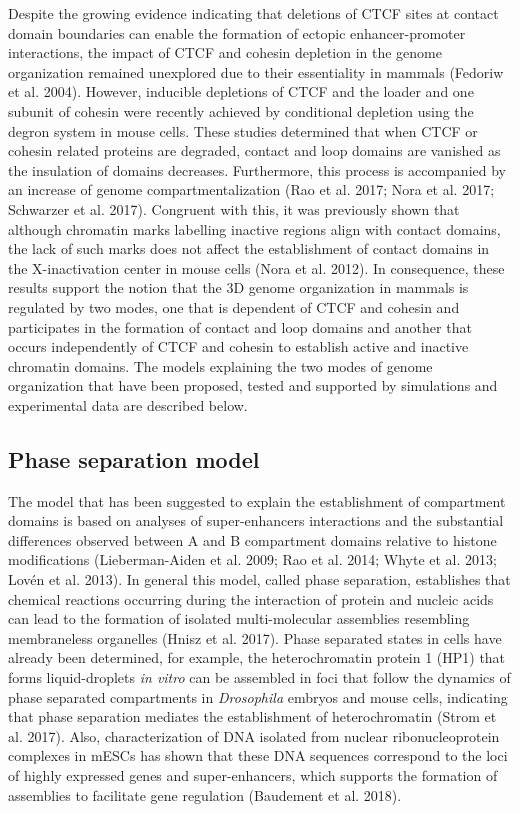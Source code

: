 Despite the growing evidence indicating that deletions of CTCF sites at contact domain boundaries can enable the formation of ectopic enhancer-promoter interactions, the impact of CTCF and cohesin depletion in the genome organization remained unexplored due to their essentiality in mammals (Fedoriw et al. 2004). However, inducible depletions of CTCF and the loader and one subunit of cohesin were recently achieved by conditional depletion using the degron system in mouse cells. These studies determined that when CTCF or cohesin related proteins are degraded, contact and loop domains are vanished as the insulation of domains decreases. Furthermore, this process is accompanied by an increase of genome compartmentalization (Rao et al. 2017; Nora et al. 2017; Schwarzer et al. 2017). Congruent with this, it was previously shown that although chromatin marks labelling inactive regions align with contact domains, the lack of such marks does not affect the establishment of contact domains in the X-inactivation center in mouse cells (Nora et al. 2012). In consequence, these results support the notion that the 3D genome organization in mammals is regulated by two modes, one that is dependent of CTCF and cohesin and participates in the formation of contact and loop domains and another that occurs independently of CTCF and cohesin to establish active and inactive chromatin domains. The models explaining the two modes of genome organization that have been proposed, tested and supported by simulations and experimental data are described below.\\

		\subsection{Phase separation model}

The model that has been suggested to explain the establishment of compartment domains is based on analyses of super-enhancers interactions and the substantial differences observed between A and B compartment domains relative to histone modifications (Lieberman-Aiden et al. 2009; Rao et al. 2014; Whyte et al. 2013; Lovén et al. 2013). In general this model, called phase separation, establishes that chemical reactions occurring during the interaction of protein and nucleic acids can lead to the formation of isolated multi-molecular assemblies resembling membraneless organelles (Hnisz et al. 2017). Phase separated states in cells have already been determined, for example, the heterochromatin protein 1 (HP1) that forms liquid-droplets \textit{in vitro} can be assembled in foci that follow the dynamics of phase separated compartments in \textit{Drosophila} embryos and mouse cells, indicating that phase separation mediates the establishment of heterochromatin (Strom et al. 2017). Also, characterization of DNA isolated from nuclear ribonucleoprotein complexes in mESCs has shown that these DNA sequences correspond to the loci of highly expressed genes and super-enhancers, which supports the formation of assemblies to facilitate gene regulation (Baudement et al. 2018).\\

